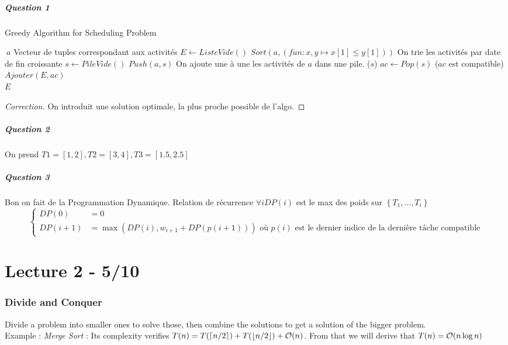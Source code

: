 \documentclass{cours}
\begin{document}
\subsubsection{Question 1}
\begin{algorithm}
   \caption{Greedy Algorithm for Scheduling Problem} 
   \begin{algorithmic}
        \Input $\ a$ \Comment Vecteur de tuples correspondant aux activités 
        \EndInput
        \State $E \gets ListeVide()$
        \State $Sort(a, (fun : x, y \mapsto x[1] \leq y[1]))$ \Comment On trie les activités par date de fin croissante
        \State $s \gets PileVide()$
        \State $Push(a, s)$  \Comment On ajoute une à une les activités de $a$ dans une pile.
        \While ($s$)
            \State $ac \gets Pop(s)$
            \If ($ac$ est compatible)
                \State $Ajouter(E, ac)$
            \EndIf
        \EndWhile\\
        \Return $E$
   \end{algorithmic}
\end{algorithm}
\begin{proof}[Correction]
    On introduit une solution optimale, la plus proche possible de l'algo.     
\end{proof}

\subsubsection{Question 2}
On prend $T1 = \left[1, 2\right], T2 = \left[3, 4\right], T3 = \left[1.5, 2.5\right]$

\subsubsection{Question 3}
Bon on fait de la Programmation Dynamique. Relation de récurrence $\forall i DP(i)$ est le max des poids sur $\left\{T_{1}, \ldots, T_{i}\right\}$
\[
\begin{cases}
    DP(0) &= 0\\
    DP(i+1) &= \max(DP(i), w_{i+1} + DP(p(i+1))) \text{ où } p(i) \text{ est le dernier indice de la dernière tâche compatible} 
\end{cases}    
\]

\part[Recursion]{Lecture 2 - 5/10}
\localtableofcontents
\section{Divide and Conquer}
Divide a problem into smaller ones to solve those, then combine the solutions to get a solution of the bigger problem.\\
Example : \textsl{Merge Sort} : Its complexity verifies $T(n) = T(\lceil n/2\rceil) + T(\lfloor n/2 \rfloor) + \mathcal{O}(n)$. From that we will derive that $T(n) = \mathcal{O}(n\log n)$
\end{document}
